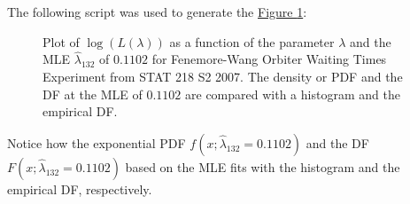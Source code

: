 \begin{example}
The following script was used to generate the \hyperref[F:ExponentialMLEOrbiter]{Figure \ref*{F:ExponentialMLEOrbiter}}:
\begin{figure}[htpb]
\caption{Plot of $\log(L(\lambda))$ as a function of the parameter $\lambda$  and the MLE $\widehat{\lambda}_{132}$ of $0.1102$ for Fenemore-Wang Orbiter Waiting Times Experiment from STAT 218 S2 2007.  The density or PDF and the DF at the MLE of $0.1102$ are compared with a histogram and the empirical DF.\label{F:ExponentialMLEOrbiter}}
\centering   {}
\end{figure}
Notice how the exponential PDF $f(x;\widehat{\lambda}_{132}=0.1102)$ and the DF $F(x;\widehat{\lambda}_{132}=0.1102)$ based on the MLE fits with the histogram and the empirical DF, respectively.  


\end{example}
